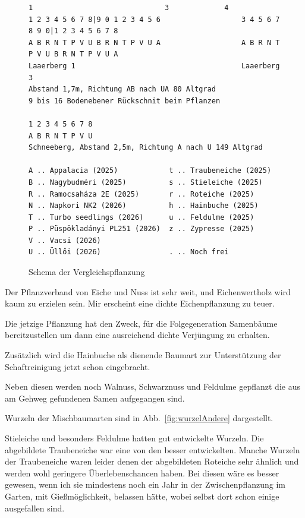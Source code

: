 \documentclass[twocolumn]{scrartcl}
\begin{document}
\begin{figure}[htb]
\begin{Verbatim}[fontsize=\footnotesize]
                  1                               3             4
1 2 3 4 5 6 7 8|9 0 1 2 3 4 5 6                   3 4 5 6 7 8 9 0|1 2 3 4 5 6 7 8
A B R N T P V U B R N T P V U A                   A B R N T P V U B R N T P V U A
Laaerberg 1                                       Laaerberg 3
Abstand 1,7m, Richtung AB nach UA 80 Altgrad
9 bis 16 Bodenebener Rückschnit beim Pflanzen

1 2 3 4 5 6 7 8
A B R N T P V U
Schneeberg, Abstand 2,5m, Richtung A nach U 149 Altgrad

A .. Appalacia (2025)            t .. Traubeneiche (2025)
B .. Nagybudméri (2025)          s .. Stieleiche (2025)
R .. Ramocsaháza 2E (2025)       r .. Roteiche (2025)
N .. Napkori NK2 (2026)          h .. Hainbuche (2025)
T .. Turbo seedlings (2026)      u .. Feldulme (2025)
P .. Püspökladányi PL251 (2026)  z .. Zypresse (2025)
V .. Vacsi (2026)
U .. Üllői (2026)                . .. Noch frei
\end{Verbatim}
\caption{Schema der Vergleichspflanzung}
\label{fig:versuchsflaeche}
\end{figure}

Der Pflanzverband von Eiche und Nuss ist sehr weit, und Eichenwertholz
wird kaum zu erzielen sein. Mir erscheint eine dichte Eichenpflanzung
zu teuer.

Die jetzige Pflanzung hat den Zweck, für die Folgegeneration
Samenbäume bereitzustellen um dann eine ausreichend dichte Verjüngung
zu erhalten.

Zusätzlich wird die Hainbuche als dienende Baumart zur Unterstützung
der Schaftreinigung jetzt schon eingebracht.

Neben diesen werden noch Walnuss, Schwarznuss und Feldulme gepflanzt
die aus am Gehweg gefundenen Samen aufgegangen sind.

Wurzeln der Mischbaumarten sind in Abb.~\ref{fig:wurzelAndere}
dargestellt.

Stieleiche und besonders Feldulme hatten gut entwickelte Wurzeln. Die
abgebildete Traubeneiche war eine von den besser entwickelten. Manche
Wurzeln der Traubeneiche waren leider denen der abgebildeten Roteiche
sehr ähnlich und werden wohl geringere Überlebenschancen haben. Bei
diesen wäre es besser gewesen, wenn ich sie mindestens noch ein Jahr
in der Zwischenpflanzung im Garten, mit Gießmöglichkeit, belassen
hätte, wobei selbst dort schon einige ausgefallen sind.
\end{document}
